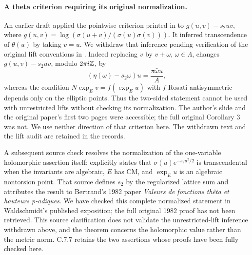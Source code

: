 \paragraph{A theta criterion requiring its original normalization.}
An earlier draft applied the pointwise criterion printed in
\citet[final slide, comment (c)]{bertrand2017} to
$g(u,v)-s_2uv$, where
$g(u,v)=\log(\sigma(u+v)/(\sigma(u)\sigma(v)))$.
It inferred transcendence of $\theta(u)$ by taking $v=u$.
We withdraw that inference pending verification of the original
lift conventions in \citet[Corollary 3]{bertrand1984}.
Indeed replacing $v$ by $v+\omega$, $\omega\in\Lambda$,
changes $g(u,v)-s_2uv$, modulo $2\pi i\mathbb Z$, by
\[
 (\eta(\omega)-s_2\omega)u=\frac{\pi\bar\omega u}{A},
\]
whereas the condition $N\exp_Ev=f(\exp_Eu)$ with $f$
Rosati-antisymmetric depends only on the elliptic points.
Thus the two-sided statement cannot be used with unrestricted
lifts without checking its normalization. The author's slide
and the original paper's first two pages were accessible;
the full original Corollary 3 was not. We use neither direction
of that criterion here. The withdrawn text and the lift audit
are retained in the records.

A subsequent source check resolves the normalization of the
one-variable holomorphic assertion itself:
\citet[p.~15-03]{waldschmidt1988theta} explicitly states that
$\sigma(u)e^{-s_2u^2/2}$ is transcendental when the invariants
are algebraic, $E$ has CM, and $\exp_Eu$ is an algebraic
nontorsion point.  That source defines $s_2$ by the regularized
lattice sum and attributes the result to Bertrand's 1982
paper \emph{Valeurs de fonctions th\^eta et hauteurs p-adiques}.
We have checked this complete normalized statement in
Waldschmidt's published exposition; the full original 1982
proof has not been retrieved.  This source clarification
does not validate the unrestricted-lift inference withdrawn
above, and the theorem concerns the holomorphic value rather
than the metric norm.  C.7.7 retains the two assertions whose
proofs have been fully checked here.

